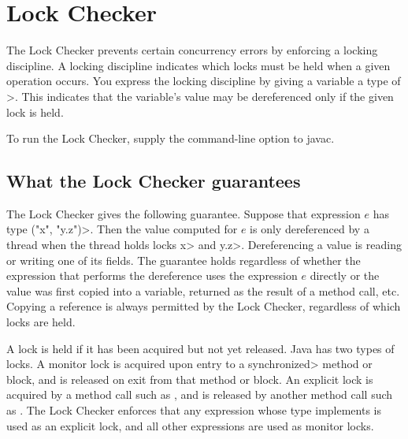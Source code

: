 \htmlhr
\chapter{Lock Checker\label{lock-checker}}

The Lock Checker prevents certain concurrency errors by enforcing a
locking discipline.  A locking discipline indicates which locks must be held
when a given operation occurs.  You express the locking discipline by
giving a variable a type of
\<>.
This indicates that the variable's value may
be dereferenced only if the given lock is held.


To run the Lock Checker, supply the
command-line option to javac.


\section{What the Lock Checker guarantees\label{lock-guarantees}}

The Lock Checker gives the following guarantee.
Suppose that expression $e$ has type
\<(\ttlcb"x", "y.z"\ttrcb)>.
Then the value computed for $e$ is only dereferenced by a thread when the
thread holds locks \<x> and \<y.z>.
Dereferencing a value is reading or writing one of its fields.
The guarantee holds regardless of whether the expression that performs the dereference uses the expression $e$
directly or the value was first copied into a variable, returned as the
result of a method call, etc.
Copying a reference is always
permitted by the Lock Checker, regardless of which locks are held.

A lock is held if it has been acquired but not yet released.
Java has two types of locks.
A monitor lock is acquired upon entry to a \<synchronized> method or block,
and is released on exit from that method or block.
An explicit lock is acquired by a method call such as
,
and is released by another method call such as
.
The Lock Checker enforces that any expression whose type implements
 is used as an
explicit lock, and all other expressions are used as monitor locks.

